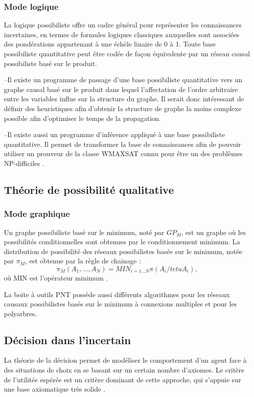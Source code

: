 \subsubsection{Mode logique}
La logique possibiliste offre un cadre général pour représenter les connaissances incertaines, en termes de formules logiques classiques auxquelles sont associées des pondérations appartenant à une échèle linaire de 0 à 1. Toute base possibiliste quantitative peut être codée de façon équivalente par un réseau causal possibiliste basé sur le produit.

–Il existe un programme de passage d’une base possibiliste quantitative vers un graphe causal basé sur le produit dans lequel l’affectation de l’ordre arbitraire entre les variables influe sur la structure du graphe. Il serait donc intéressant de définir des heuristiques afin d’obtenir la structure de graphe la moins complexe possible afin d’optimiser
le temps de la propagation.

–Il existe aussi un programme d’inférence appliqué à une base possibiliste quantitative. Il permet de transformer la base de connaissances afin de pouvoir utiliser un prouveur de la classe WMAXSAT connu pour être un des problèmes NP-difficiles \cite{hkhallafiThesis}.

\subsection{Théorie de possibilité qualitative}
\subsubsection{Mode graphique}

Un graphe possibiliste basé sur le minimum, noté par $GP_{M}$, est un graphe où les possibilités conditionnelles sont obtenues par le conditionnement minimum. La distribution de possibilité des réseaux possibilistes basée sur le minimum, notée par $\pi_{M}$, est obtenue par la règle de chainage :
\begin{equation}
 \pi_{M} (A_1, \dots, A_N) = MIN_{i=1 \dots N} \pi (A_i/teta A_i),
\end{equation}
où MIN est  l’opérateur minimum \cite{BoBrDu2008.1}.

La boite à outils PNT possède aussi différents algorithmes pour les réseaux causaux possibilistes basés sur le minimum à connexions multiples et pour les polyarbres. 

\subsection{Décision dans l’incertain}
La théorie de la décision permet de modéliser le comportement d'un agent face
à des situations de choix en se basant sur un certain nombre d'axiomes. Le critère
de l'utilitée espérée est un critère dominant de cette approche, qui s'appuie sur une
base axiomatique très solide \cite{hkhaoulaThesis}.
